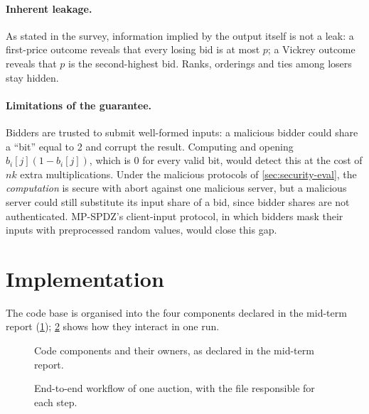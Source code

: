 \documentclass[11pt,a4paper]{article}
\begin{document}
\paragraph{Inherent leakage.}
As stated in the survey, information implied by the output itself is not a leak: a first-price
outcome reveals that every losing bid is at most $p$; a Vickrey outcome reveals that $p$ is the
second-highest bid. Ranks, orderings and ties among losers stay hidden.

\paragraph{Limitations of the guarantee.}
Bidders are trusted to submit well-formed inputs: a malicious bidder could share a ``bit'' equal
to 2 and corrupt the result. Computing and opening $b_i[j](1 - b_i[j])$, which is 0 for every
valid bit, would detect this at the cost of $nk$ extra multiplications. Under the malicious protocols of \cref{sec:security-eval}, the \emph{computation} is
secure with abort against one malicious server, but a malicious server could still substitute its
input share of a bid, since bidder shares are not authenticated. MP-SPDZ's client-input protocol,
in which bidders mask their inputs with preprocessed random values, would close this gap.

\section{Implementation}
\label{sec:impl}

The code base is organised into the four components declared in the mid-term report
(\cref{fig:components}); \cref{fig:workflow} shows how they interact in one run.

\begin{figure}[H]
  \centering
  \resizebox{\linewidth}{!}{}
  \caption{Code components and their owners, as declared in the mid-term report.}
  \label{fig:components}
\end{figure}

\begin{figure}[H]
  \centering
  \resizebox{0.95\linewidth}{!}{}
  \caption{End-to-end workflow of one auction, with the file responsible for each step.}
  \label{fig:workflow}
\end{figure}
\end{document}
